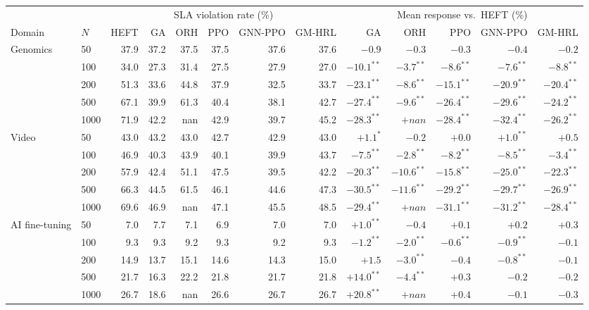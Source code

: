 \begin{tabular}{llrrrrrr|rrrrr}
\toprule
& & \multicolumn{6}{c|}{SLA violation rate (\%)} & \multicolumn{5}{c}{Mean response vs.\ HEFT (\%)} \\
Domain & $N$ & HEFT & GA & ORH & PPO & GNN-PPO & GM-HRL & GA & ORH & PPO & GNN-PPO & GM-HRL \\
\midrule
Genomics & 50 & 37.9 & 37.2 & 37.5 & 37.5 & 37.6 & 37.6 & $-0.9$ & $-0.3$ & $-0.3$ & $-0.4$ & $-0.2$ \\
 & 100 & 34.0 & 27.3 & 31.4 & 27.5 & 27.9 & 27.0 & $-10.1^{**}$ & $-3.7^{**}$ & $-8.6^{**}$ & $-7.6^{**}$ & $-8.8^{**}$ \\
 & 200 & 51.3 & 33.6 & 44.8 & 37.9 & 32.5 & 33.7 & $-23.1^{**}$ & $-8.6^{**}$ & $-15.1^{**}$ & $-20.9^{**}$ & $-20.4^{**}$ \\
 & 500 & 67.1 & 39.9 & 61.3 & 40.4 & 38.1 & 42.7 & $-27.4^{**}$ & $-9.6^{**}$ & $-26.4^{**}$ & $-29.6^{**}$ & $-24.2^{**}$ \\
 & 1000 & 71.9 & 42.2 & nan & 42.9 & 39.7 & 45.2 & $-28.3^{**}$ & $+nan$ & $-28.4^{**}$ & $-32.4^{**}$ & $-26.2^{**}$ \\
Video & 50 & 43.0 & 43.2 & 43.0 & 42.7 & 42.9 & 43.0 & $+1.1^{*}$ & $-0.2$ & $+0.0$ & $+1.0^{**}$ & $+0.5$ \\
 & 100 & 46.9 & 40.3 & 43.9 & 40.1 & 39.9 & 43.7 & $-7.5^{**}$ & $-2.8^{**}$ & $-8.2^{**}$ & $-8.5^{**}$ & $-3.4^{**}$ \\
 & 200 & 57.9 & 42.4 & 51.1 & 47.5 & 39.5 & 42.2 & $-20.3^{**}$ & $-10.6^{**}$ & $-15.8^{**}$ & $-25.0^{**}$ & $-22.3^{**}$ \\
 & 500 & 66.3 & 44.5 & 61.5 & 46.1 & 44.6 & 47.3 & $-30.5^{**}$ & $-11.6^{**}$ & $-29.2^{**}$ & $-29.7^{**}$ & $-26.9^{**}$ \\
 & 1000 & 69.6 & 46.9 & nan & 47.1 & 45.5 & 48.5 & $-29.4^{**}$ & $+nan$ & $-31.1^{**}$ & $-31.2^{**}$ & $-28.4^{**}$ \\
AI fine-tuning & 50 & 7.0 & 7.7 & 7.1 & 6.9 & 7.0 & 7.0 & $+1.0^{**}$ & $-0.4$ & $+0.1$ & $+0.2$ & $+0.3$ \\
 & 100 & 9.3 & 9.3 & 9.2 & 9.3 & 9.2 & 9.3 & $-1.2^{**}$ & $-2.0^{**}$ & $-0.6^{**}$ & $-0.9^{**}$ & $-0.1$ \\
 & 200 & 14.9 & 13.7 & 15.1 & 14.6 & 14.3 & 15.0 & $+1.5$ & $-3.0^{**}$ & $-0.4$ & $-0.8^{**}$ & $-0.1$ \\
 & 500 & 21.7 & 16.3 & 22.2 & 21.8 & 21.7 & 21.8 & $+14.0^{**}$ & $-4.4^{**}$ & $+0.3$ & $-0.2$ & $-0.2$ \\
 & 1000 & 26.7 & 18.6 & nan & 26.6 & 26.7 & 26.7 & $+20.8^{**}$ & $+nan$ & $+0.4$ & $-0.1$ & $-0.3$ \\

\end{tabular}
